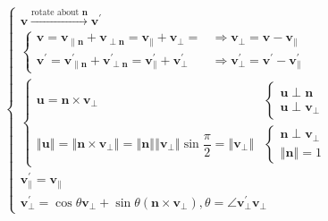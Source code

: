 \documentclass[
]{book}
\theoremstyle{definition}
\theoremstyle{definition}
\theoremstyle{definition}
\theoremstyle{definition}
\theoremstyle{remark}
\begin{document}
\[
\begin{aligned}
 & \begin{cases}
\boldsymbol{v}\xrightarrow{\text{rotate about }\boldsymbol{n}}\boldsymbol{v}^{\prime}\\
\begin{cases}
\boldsymbol{v}=\boldsymbol{v}_{{\scriptscriptstyle \parallel\boldsymbol{n}}}+\boldsymbol{v}_{{\scriptscriptstyle \perp\boldsymbol{n}}}=\boldsymbol{v}_{{\scriptscriptstyle \parallel}}+\boldsymbol{v}_{{\scriptscriptstyle \perp}}= & \Rightarrow\boldsymbol{v}_{{\scriptscriptstyle \perp}}=\boldsymbol{v}-\boldsymbol{v}_{{\scriptscriptstyle \parallel}}\\
\boldsymbol{v}^{\prime}=\boldsymbol{v}_{{\scriptscriptstyle \parallel\boldsymbol{n}}}^{\prime}+\boldsymbol{v}_{{\scriptscriptstyle \perp\boldsymbol{n}}}^{\prime}=\boldsymbol{v}_{{\scriptscriptstyle \parallel}}^{\prime}+\boldsymbol{v}_{{\scriptscriptstyle \perp}}^{\prime} & \Rightarrow\boldsymbol{v}_{{\scriptscriptstyle \perp}}^{\prime}=\boldsymbol{v}^{\prime}-\boldsymbol{v}_{{\scriptscriptstyle \parallel}}^{\prime}
\end{cases}\\
\begin{cases}
\boldsymbol{u}=\boldsymbol{n}\times\boldsymbol{v}_{{\scriptscriptstyle \perp}} & \begin{cases}
\boldsymbol{u}\perp\boldsymbol{n}\\
\boldsymbol{u}\perp\boldsymbol{v}_{{\scriptscriptstyle \perp}}
\end{cases}\\
\left\Vert \boldsymbol{u}\right\Vert =\left\Vert \boldsymbol{n}\times\boldsymbol{v}_{{\scriptscriptstyle \perp}}\right\Vert =\left\Vert \boldsymbol{n}\right\Vert \left\Vert \boldsymbol{v}_{{\scriptscriptstyle \perp}}\right\Vert \sin\dfrac{\pi}{2}=\left\Vert \boldsymbol{v}_{{\scriptscriptstyle \perp}}\right\Vert  & \begin{cases}
\boldsymbol{n}\perp\boldsymbol{v}_{{\scriptscriptstyle \perp}}\\
\left\Vert \boldsymbol{n}\right\Vert =1
\end{cases}
\end{cases}\\
\boldsymbol{v}_{{\scriptscriptstyle \parallel}}^{\prime}=\boldsymbol{v}_{{\scriptscriptstyle \parallel}}\\
\boldsymbol{v}_{{\scriptscriptstyle \perp}}^{\prime}=\cos\theta\boldsymbol{v}_{{\scriptscriptstyle \perp}}+\sin\theta\left(\boldsymbol{n}\times\boldsymbol{v}_{{\scriptscriptstyle \perp}}\right),\theta=\angle\boldsymbol{v}_{{\scriptscriptstyle \perp}}^{\prime}\boldsymbol{v}_{{\scriptscriptstyle \perp}}

\end{cases}
\end{aligned}\]
\end{document}
